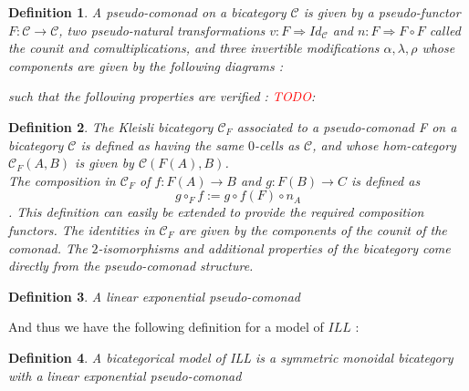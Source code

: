 \documentclass[a4paper, 12pt, twoside,openright]{report}
\newtheorem{definition}{Definition}
\newcommand{\todo}[1]{\textcolor{red}{TODO}: \underline{#1}}
\begin{document}
\begin{definition}
A pseudo-comonad on a bicategory $\mathcal{C}$ is given by a pseudo-functor $F: \mathcal{C} \rightarrow \mathcal{C}$, two pseudo-natural transformations $v:F \Rightarrow Id_{\mathcal{C}}$ and $n: F \Rightarrow F \circ F$ called the counit and comultiplications, and three invertible modifications $ \alpha,\lambda,\rho$ whose components are given by the following diagrams : \\
such that the following properties are verified : 
\todo{}
\end{definition}
\begin{definition}
The Kleisli bicategory $\mathcal{C}_F$ associated to a pseudo-comonad F on a bicategory $\mathcal{C}$ is defined as having the same $0$-cells as $\mathcal{C}$, and whose hom-category $\mathcal{C}_F (A,B)$ is given by $\mathcal{C}(F(A),B)$. \\
The composition in $\mathcal{C}_F$ of $f:F(A)\rightarrow B$ and $g:F(B) \rightarrow C$ is defined as $$g \circ_F f := g \circ f(F) \circ n_A$$.
This definition can easily be extended to provide the required composition functors. The identities in $\mathcal{C}_F$ are given by the components of the counit of the comonad. The $2$-isomorphisms and additional properties of the bicategory come directly from the pseudo-comonad structure.
\end{definition}
\begin{definition}
A linear exponential pseudo-comonad 
\end{definition}
And thus we have the following definition for a model of $ILL$ : 
\begin{definition}
A bicategorical model of ILL is a symmetric monoidal bicategory with a linear exponential pseudo-comonad
\end{definition}
\end{document}
